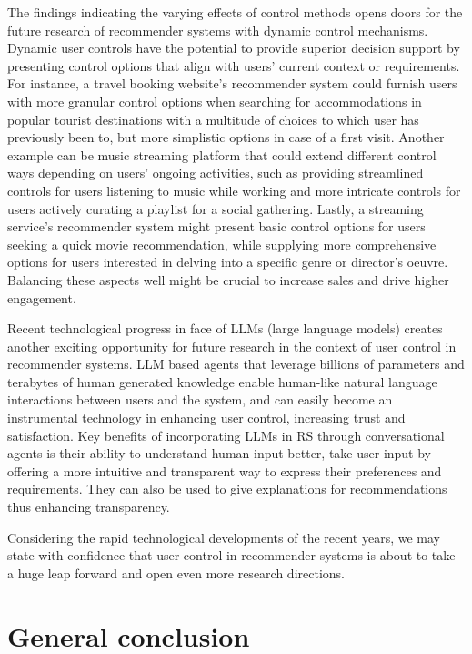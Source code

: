 \documentclass[a4paper,12pt]{article}
\begin{document}
The findings indicating the varying effects of control methods opens doors for the future research of recommender systems with dynamic control mechanisms. Dynamic user controls have the potential to provide superior decision support by presenting control options that align with users' current context or requirements. For instance, a travel booking website's recommender system could furnish users with more granular control options when searching for accommodations in popular tourist destinations with a multitude of choices to which user has previously been to, but more simplistic options in case of a first visit. Another example can be  music streaming platform that could extend different control ways depending on users' ongoing activities, such as providing streamlined controls for users listening to music while working and more intricate controls for users actively curating a playlist for a social gathering. Lastly, a streaming service's recommender system might present basic control options for users seeking a quick movie recommendation, while supplying more comprehensive options for users interested in delving into a specific genre or director's oeuvre. Balancing these aspects well might be crucial to increase sales and drive higher engagement.

Recent technological progress in face of LLMs (large language models) creates another exciting opportunity for future research in the context of user control in recommender systems. LLM based agents that leverage billions of parameters and terabytes of human generated knowledge enable human-like natural language interactions between users and the system, and can easily become an instrumental technology in enhancing user control, increasing trust and satisfaction. Key benefits of incorporating LLMs in RS through conversational agents is their ability to understand human input better, take user input by offering a more intuitive and transparent way to express their preferences and requirements. They can also be used to give explanations for recommendations thus enhancing transparency.

Considering the rapid technological developments of the recent years, we may state with confidence that user control in recommender systems is about to take a huge leap forward and open even more research directions. 



\newpage

\section{General conclusion}
\end{document}
